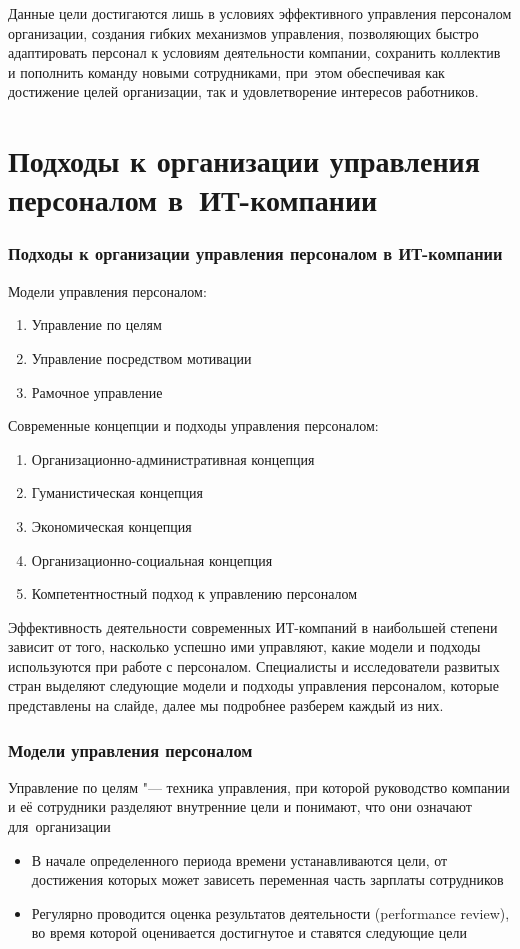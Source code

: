 \documentclass{../industrial-development}
\begin{document}
	Данные цели достигаются лишь в условиях эффективного управления персоналом организации, создания гибких механизмов управления, позволяющих быстро адаптировать персонал к условиям деятельности компании, сохранить  коллектив и пополнить команду новыми сотрудниками, при~этом обеспечивая как достижение целей организации, так и удовлетворение интересов работников.
	
	\section{Подходы к организации управления персоналом в~ИТ-компании}
	
	\begin{frame} \frametitle{Подходы к организации управления персоналом в ИТ-компании}
		Модели управления персоналом:
		\begin{enumerate}
			\item Управление по целям
			\item Управление посредством мотивации
			\item Рамочное управление
		\end{enumerate}
		Современные концепции и подходы управления персоналом:
		\begin{enumerate}
			\item Организационно-административная концепция 
			\item Гуманистическая концепция
			\item Экономическая концепция
			\item Организационно-социальная концепция
			\item Компетентностный подход к управлению персоналом
		\end{enumerate}
	\end{frame}
	\lecturenotes
	
	Эффективность деятельности современных ИТ-компаний в наибольшей степени зависит от того, насколько успешно ими управляют, какие модели и подходы используются при работе с персоналом. Специалисты и исследователи развитых стран выделяют следующие модели и подходы управления персоналом, которые представлены на слайде, далее мы подробнее разберем каждый из них.
	
	\begin{frame} \frametitle{Модели управления персоналом}
		\alert{Управление по целям} "--- техника управления, при которой руководство компании и её сотрудники разделяют внутренние цели и понимают, что они означают для~организации
		\begin{itemize}
			\item В начале определенного периода времени устанавливаются цели, от достижения которых может зависеть переменная часть зарплаты сотрудников
			\item Регулярно проводится оценка результатов деятельности (performance review), во время которой оценивается достигнутое и ставятся следующие цели
		\end{itemize}
	\end{frame}
	\lecturenotes
	
\end{document}
